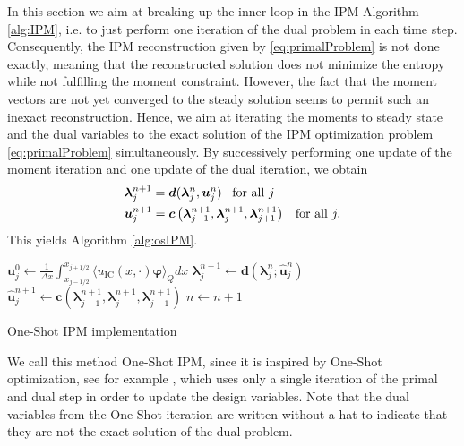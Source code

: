 In this section we aim at breaking up the inner loop in the IPM Algorithm \ref{alg:IPM}, i.e. to just perform one iteration of the dual problem in each time step. Consequently, the IPM reconstruction given by \eqref{eq:primalProblem} is not done exactly, meaning that the reconstructed solution does not minimize the entropy while not fulfilling the moment constraint. However, the fact that the moment vectors are not yet converged to the steady solution seems to permit such an inexact reconstruction. Hence, we aim at iterating the moments to steady state and the dual variables to the exact solution of the IPM optimization problem \eqref{eq:primalProblem} simultaneously.
By successively performing one update of the moment iteration and one update of the dual iteration, we obtain 
\begin{subequations}\label{eq:oneshotIPM}
\begin{align}
&\bm{\lambda}_{j}^{n+1} =  \bm{d}(\bm{\lambda}_j^{n},\bm{u}_j^{n}) \enskip \text{ for all }j \label{eq:oneshotIPMdual}\\
&\bm{u}_j^{n+1} =  \bm{c}\left(\bm{\lambda}_{j-1}^{n+1},\bm{\lambda}_{j}^{n+1},\bm{\lambda}_{j+1}^{n+1}\right) \enskip \text{ for all }j \label{eq:oneshotIPMmoment}.
\end{align}
\end{subequations}
This yields Algorithm \ref{alg:osIPM}.
\begin{algorithm}[H]
\begin{algorithmic}[1]
\State $\bm{u}_j^0 \leftarrow \frac{1}{\Delta x} \int_{x_{j-1/ 2}}^{x_{j+1/ 2}} \langle u_{\text{IC}}(x, \cdot) \bm{\varphi} \rangle_Q dx$
\EndFor
{}
\State $\bm{\lambda}_j^{n+1} \leftarrow \bm{d}(\bm{\lambda}_{j}^{n};\bm{\hat u}_j^{n})$
\EndFor
{}
\State $\bm{\hat u}_j^{n+1} \leftarrow \bm{c}(\bm{\lambda}_{j-1}^{n+1},\bm{\lambda}_j^{n+1},\bm{\lambda}_{j+1}^{n+1})$
\EndFor
\State $n \leftarrow n+1$
\EndWhile
\end{algorithmic}
\caption{One-Shot IPM implementation}
\label{alg:osIPM}
\end{algorithm}
We call this method One-Shot IPM, since it is inspired by One-Shot optimization, see for example \cite{hazra2005aerodynamic}, which uses only a single iteration of the primal and dual step in order to update the design variables. Note that the dual variables from the One-Shot iteration are written without a hat to indicate that they are not the exact solution of the dual problem.

